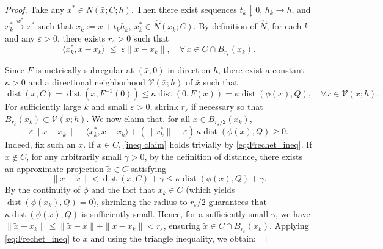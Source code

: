 \documentclass[12pt,twoside,reqno]{amsart}
\theoremstyle{definition}
\numberwithin{equation}{section}
\begin{document}
\begin{proof}
Take any \( x^* \in N(\bar{x}; C; h) \).  
Then there exist sequences \( t_k \downarrow 0 \), \( h_k \to h \), and \( x_k^* \xrightarrow{w^*} x^* \) such that $x_k := \bar{x} + t_k h_k, ~x_k^* \in \hat{N}(x_k; C)$. 
By definition of $\hat N$, for each \( k \) and any \( \varepsilon > 0 \), there exists \( r_\varepsilon > 0 \) such that
\begin{equation}\label{eq:Frechet_ineq}
    \langle x_k^*, x - x_k \rangle 
    \;\leq\; \varepsilon \|x - x_k\|, 
    \quad \forall\, x \in C \cap B_{r_\varepsilon}(x_k).
\end{equation}

Since \( F \) is metrically subregular at \( (\bar{x}, 0) \) in direction \( h \), there exist a constant \( \kappa > 0 \) and a directional neighborhood \( \mathcal{V}(\bar x; h) \) of \( \bar x \) such that
\begin{equation}\label{eq:metric_subreg}
    \operatorname{dist}(x, C)
    = \operatorname{dist}(x, F^{-1}(0))
    \leq \kappa \operatorname{dist}(0, F(x))
    = \kappa \operatorname{dist}(\phi(x), Q),
    \quad \forall x \in \mathcal{V}(\bar x; h).
\end{equation}
For sufficiently large \( k \) and small \( \varepsilon > 0 \), shrink \( r_\varepsilon \) if necessary so that \( B_{r_\varepsilon}(x_k) \subset  \mathcal{V}(\bar{x}; h) \).  
We now claim that, for all \( x \in B_{r_\varepsilon/2}(x_k) \),
\begin{equation}\label{ineq claim}
    \varepsilon \|x - x_k\| - \langle x_k^*, x - x_k \rangle 
    + (\|x_k^*\| + \varepsilon)\, \kappa \operatorname{dist}(\phi(x), Q) \geq 0.
\end{equation}
Indeed, fix such an \( x \). If $x \in C$, \eqref{ineq claim} holds trivially by \eqref{eq:Frechet_ineq}. If $x \notin C$, for any arbitrarily small $\gamma > 0$, by the definition of distance, there exists an approximate projection \( \tilde{x} \in C \) satisfying
\[
    \|x - \tilde{x}\| < \operatorname{dist}(x, C) + \gamma \leq \kappa \operatorname{dist}(\phi(x), Q) + \gamma.
\]
By the continuity of $\phi$ and the fact that $x_k \in C$ (which yields $\operatorname{dist}(\phi(x_k), Q) = 0$), shrinking the radius to $r_\varepsilon/2$ guarantees that $\kappa \operatorname{dist}(\phi(x), Q)$ is sufficiently small. Hence, for a sufficiently small $\gamma$, we have $\|\tilde{x} - x_k\| \leq \|\tilde{x} - x\| + \|x - x_k\| < r_\varepsilon$, ensuring $\tilde{x} \in C \cap B_{r_\varepsilon}(x_k)$.
Applying \eqref{eq:Frechet_ineq} to $\tilde{x}$ and using the triangle inequality, we obtain:

\end{proof}
\end{document}
